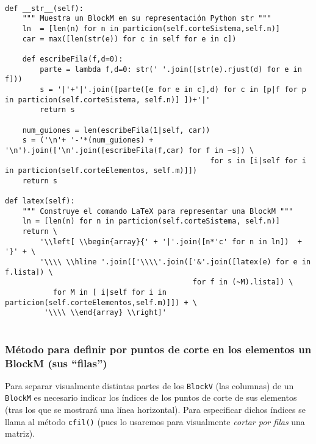 \documentclass[11pt]{report}
\begin{document}
\begin{verbatim}

def __str__(self):
    """ Muestra un BlockM en su representación Python str """
    ln  = [len(n) for n in particion(self.corteSistema,self.n)]
    car = max([len(str(e)) for c in self for e in c])

    def escribeFila(f,d=0):
        parte = lambda f,d=0: str(' '.join([str(e).rjust(d) for e in f])) 
        s = '|'+'|'.join([parte([e for e in c],d) for c in [p|f for p in particion(self.corteSistema, self.n)] ])+'|'
        return s
    
    num_guiones = len(escribeFila(1|self, car))
    s = ('\n'+ '-'*(num_guiones) + '\n').join(['\n'.join([escribeFila(f,car) for f in ~s]) \
                                               for s in [i|self for i in particion(self.corteElementos, self.m)]])
    return s

def latex(self):
    """ Construye el comando LaTeX para representar una BlockM """
    ln = [len(n) for n in particion(self.corteSistema, self.n)]                                                           
    return \
        '\\left[ \\begin{array}{' + '|'.join([n*'c' for n in ln])  + '}' + \
        '\\\\ \\hline '.join(['\\\\'.join(['&'.join([latex(e) for e in f.lista]) \
                                           for f in (~M).lista]) \
           for M in [ i|self for i in particion(self.corteElementos,self.m)]]) + \
         '\\\\ \\end{array} \\right]'
        
\end{verbatim}

\subsubsection{Método para definir por puntos de corte en los elementos un BlockM (sus ``filas'')}
\label{sec:orgeb78a5e}

Para separar visualmente distintas partes de los \texttt{BlockV} (las
columnas) de un \texttt{BlockM} es necesario indicar los índices de los
puntos de corte de sus elementos (tras los que se mostrará una línea
horizontal). Para especificar dichos índices se llama al método
\texttt{cfil()} (pues lo usaremos para visualmente \emph{cortar por filas} una
matriz).
\end{document}
